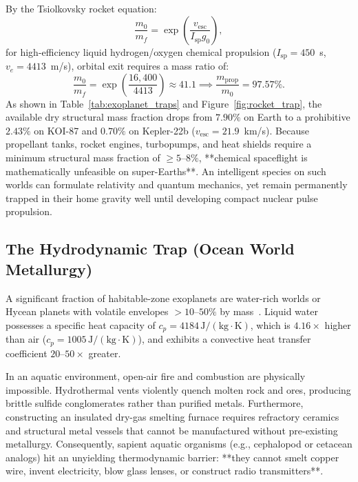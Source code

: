 \documentclass[11pt,a4paper]{article}
\begin{document}
By the Tsiolkovsky rocket equation:
\begin{equation}
\frac{m_0}{m_f} = \exp\left( \frac{v_{\mathrm{esc}}}{I_{\mathrm{sp}} g_0} \right),
\label{eq:tsiolkovsky}
\end{equation}
for high-efficiency liquid hydrogen/oxygen chemical propulsion ($I_{\mathrm{sp}} = 450$~s, $v_e = 4413$~m/s), orbital exit requires a mass ratio of:
\begin{equation}
\frac{m_0}{m_f} = \exp\left( \frac{16,400}{4413} \right) \approx 41.1 \implies \frac{m_{\mathrm{prop}}}{m_0} = 97.57\%.
\end{equation}
As shown in Table~\ref{tab:exoplanet_traps} and Figure~\ref{fig:rocket_trap}, the available dry structural mass fraction drops from $7.90\%$ on Earth to a prohibitive $2.43\%$ on KOI-87 and $0.70\%$ on Kepler-22b ($v_{\mathrm{esc}} = 21.9$~km/s). Because propellant tanks, rocket engines, turbopumps, and heat shields require a minimum structural mass fraction of $\ge 5\text{--}8\%$, **chemical spaceflight is mathematically unfeasible on super-Earths**. An intelligent species on such worlds can formulate relativity and quantum mechanics, yet remain permanently trapped in their home gravity well until developing compact nuclear pulse propulsion.

\subsection{The Hydrodynamic Trap (Ocean World Metallurgy)}

A significant fraction of habitable-zone exoplanets are water-rich worlds or Hycean planets with volatile envelopes $>10\text{--}50\%$ by mass~\cite{madhusudhan2021}. Liquid water possesses a specific heat capacity of $c_p = 4184\,\mathrm{J}/(\mathrm{kg}\cdot\mathrm{K})$, which is $4.16\times$ higher than air ($c_p = 1005\,\mathrm{J}/(\mathrm{kg}\cdot\mathrm{K})$), and exhibits a convective heat transfer coefficient $20\text{--}50\times$ greater.

In an aquatic environment, open-air fire and combustion are physically impossible. Hydrothermal vents violently quench molten rock and ores, producing brittle sulfide conglomerates rather than purified metals. Furthermore, constructing an insulated dry-gas smelting furnace requires refractory ceramics and structural metal vessels that cannot be manufactured without pre-existing metallurgy. Consequently, sapient aquatic organisms (e.g., cephalopod or cetacean analogs) hit an unyielding thermodynamic barrier: **they cannot smelt copper wire, invent electricity, blow glass lenses, or construct radio transmitters**.
\end{document}
